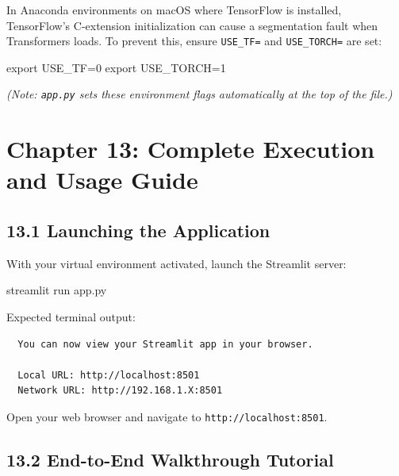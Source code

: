 \documentclass[
]{article}
\newenvironment{Shaded}{}{}
\newcommand{\BuiltInTok}[1]{\textcolor[rgb]{0.00,0.50,0.00}{#1}}
\newcommand{\ExtensionTok}[1]{#1}
\newcommand{\NormalTok}[1]{#1}
\newcommand{\OperatorTok}[1]{\textcolor[rgb]{0.40,0.40,0.40}{#1}}
\newcommand{\VariableTok}[1]{\textcolor[rgb]{0.10,0.09,0.49}{#1}}
\begin{document}
In Anaconda environments on macOS where TensorFlow is installed,
TensorFlow's C-extension initialization can cause a segmentation fault
when Transformers loads. To prevent this, ensure \texttt{USE\_\allowbreak TF=} and
\texttt{USE\_\allowbreak TORCH=} are set:

\begin{Shaded}
\begin{Highlighting}[]
\BuiltInTok{export} \VariableTok{USE\_TF}\OperatorTok{=}\NormalTok{0}
\BuiltInTok{export} \VariableTok{USE\_TORCH}\OperatorTok{=}\NormalTok{1}
\end{Highlighting}
\end{Shaded}

\emph{(Note: \texttt{app.\allowbreak py} sets these environment flags automatically
at the top of the file.)}

\section{Chapter 13: Complete Execution and Usage
Guide}\label{chapter-13-complete-execution-and-usage-guide}

\subsection{13.1 Launching the
Application}\label{launching-the-application}

With your virtual environment activated, launch the Streamlit server:

\begin{Shaded}
\begin{Highlighting}[]
\ExtensionTok{streamlit}\NormalTok{ run app.py}
\end{Highlighting}
\end{Shaded}

Expected terminal output:

\begin{verbatim}
  You can now view your Streamlit app in your browser.

  Local URL: http://localhost:8501
  Network URL: http://192.168.1.X:8501
\end{verbatim}

Open your web browser and navigate to \texttt{http:/\allowbreak /\allowbreak localhost:8501}.

\subsection{13.2 End-to-End Walkthrough
Tutorial}\label{end-to-end-walkthrough-tutorial}
\end{document}
